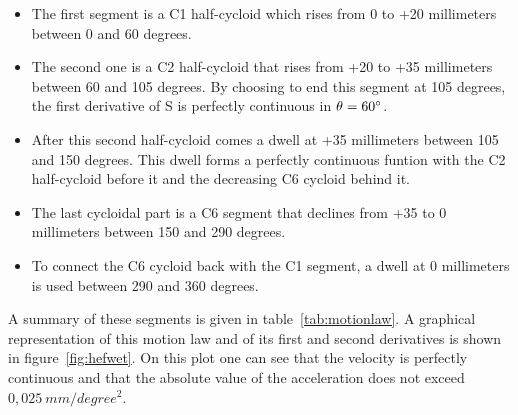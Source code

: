 \documentclass[a4paper]{article}
\begin{document}
\begin{itemize}

\item The first segment is a C1 half-cycloid which rises from 0 to +20 millimeters between 0 and 60 degrees. 

\item The second one is a C2 half-cycloid that rises from +20 to +35 millimeters between 60 and 105 degrees. By choosing to end this segment at 105 degrees, the first derivative of S is perfectly continuous in \(\theta=60\degree\).

\item After this second half-cycloid comes a dwell at +35 millimeters between 105 and 150 degrees. This dwell forms a perfectly continuous funtion with the C2 half-cycloid before it and the decreasing C6 cycloid behind it.

\item The last cycloidal part is a C6 segment that declines from +35 to 0 millimeters between 150 and 290 degrees.

\item To connect the C6 cycloid back with the C1 segment, a dwell at 0 millimeters is used between 290 and 360 degrees.

\end{itemize}

A summary of these segments is given in table~\ref{tab:motionlaw}. A graphical representation of this motion law and of its first and second derivatives is shown in figure~\ref{fig:hefwet}. On this plot one can see that the velocity is perfectly continuous and that the absolute value of the acceleration does not exceed \(0,025~\si{mm/degree^2}\).

\begin{table}[h]
	\centering
	\caption{Results of the use of the Kloomok and Muffley diagram for each segment with a lift \(L\neq0\).}
	\label{tab:motionlaw}
\end{table}
\end{document}
